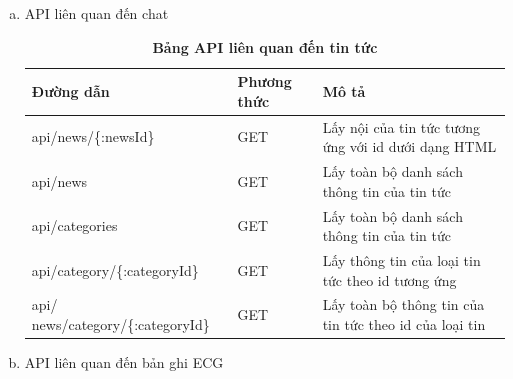 \begin{enumerate}[a)]
\begin{table}[H]
\begin{tabularx}{0.9\textwidth}{
    | >{\raggedright\arraybackslash}X
    | >{\raggedright\arraybackslash}m{2cm}
    | >{\raggedright\arraybackslash}X|
    }
    \end{tabularx}
    \label{table_api_user}
\end{table}

\item API liên quan đến chat


\begin{table}[H]
  \centering
  \caption{\bfseries \fontsize{12pt}{0pt}\selectfont Bảng API liên quan đến tin tức}
  \begin{tabularx}{0.9\textwidth}{
  | >{\raggedright\arraybackslash}X
  | >{\raggedright\arraybackslash}m{2cm}
  | >{\raggedright\arraybackslash}X|
  }
  \hline
  \bfseries Đường dẫn    &\bfseries Phương thức    &\bfseries Mô tả\\ \hline
 api/news/\{:newsId\}   &   GET  & Lấy nội của tin tức tương ứng với id dưới dạng HTML \\ \hline
 api/news   &    GET    & Lấy toàn bộ danh sách thông tin của tin tức \\ \hline
 api/categories  &   GET     & Lấy toàn bộ danh sách thông tin của tin tức \\ \hline
 api/category/\{:categoryId\}   &     GET   & Lấy thông tin của loại tin tức theo id tương ứng \\ \hline
 api/ news/category/\{:categoryId\} &   GET     & Lấy toàn bộ thông tin của tin tức theo id của loại tin \\ \hline

  \end{tabularx}
  \label{table_api_chats}
\end{table}

\item API liên quan đến bản ghi ECG



\end{enumerate}
